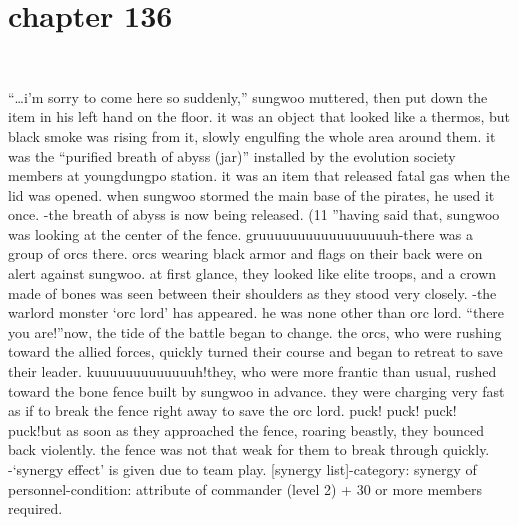\section{chapter 136}

                             




“…i’m sorry to come here so suddenly,” sungwoo muttered, then put down the item in his left hand on the floor.
it was an object that looked like a thermos, but black smoke was rising from it, slowly engulfing the whole area around them.
it was the “purified breath of abyss (jar)” installed by the evolution society members at youngdungpo station.
 it was an item that released fatal gas when the lid was opened.
when sungwoo stormed the main base of the pirates, he used it once.
-the breath of abyss is now being released.
 (11%
”having said that, sungwoo was looking at the center of the fence.
gruuuuuuuuuuuuuuuuuh-there was a group of orcs there.
 orcs wearing black armor and flags on their back were on alert against sungwoo.
at first glance, they looked like elite troops, and a crown made of bones was seen between their shoulders as they stood very closely.
-the warlord monster ‘orc lord’ has appeared.
he was none other than orc lord.
“there you are!”now, the tide of the battle began to change.
 the orcs, who were rushing toward the allied forces, quickly turned their course and began to retreat to save their leader.
kuuuuuuuuuuuuuh!they, who were more frantic than usual, rushed toward the bone fence built by sungwoo in advance.
 they were charging very fast as if to break the fence right away to save the orc lord.
puck! puck! puck! puck!but as soon as they approached the fence, roaring beastly, they bounced back violently.
 the fence was not that weak for them to break through quickly.
-‘synergy effect’ is given due to team play.
[synergy list]-category: synergy of personnel-condition: attribute of commander (level 2) + 30 or more members required.

